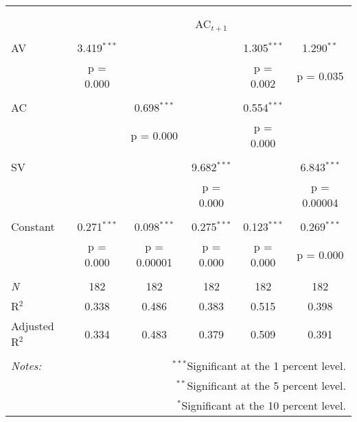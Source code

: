 
\begin{tabular}{@{\extracolsep{5pt}}lccccc} 
\\[-1.8ex]\hline 
\hline \\[-1.8ex] 
\\[-1.8ex] & \multicolumn{5}{c}{AC$_{t+1}$} \\ 
\hline \\[-1.8ex] 
 AV & 3.419$^{***}$ &  &  & 1.305$^{***}$ & 1.290$^{**}$ \\ 
  & p = 0.000 &  &  & p = 0.002 & p = 0.035 \\ 
  & & & & & \\ 
 AC &  & 0.698$^{***}$ &  & 0.554$^{***}$ &  \\ 
  &  & p = 0.000 &  & p = 0.000 &  \\ 
  & & & & & \\ 
 SV &  &  & 9.682$^{***}$ &  & 6.843$^{***}$ \\ 
  &  &  & p = 0.000 &  & p = 0.00004 \\ 
  & & & & & \\ 
 Constant & 0.271$^{***}$ & 0.098$^{***}$ & 0.275$^{***}$ & 0.123$^{***}$ & 0.269$^{***}$ \\ 
  & p = 0.000 & p = 0.00001 & p = 0.000 & p = 0.000 & p = 0.000 \\ 
  & & & & & \\ 
\textit{N} & 182 & 182 & 182 & 182 & 182 \\ 
R$^{2}$ & 0.338 & 0.486 & 0.383 & 0.515 & 0.398 \\ 
Adjusted R$^{2}$ & 0.334 & 0.483 & 0.379 & 0.509 & 0.391 \\ 
\hline 
\hline \\[-1.8ex] 
\textit{Notes:} & \multicolumn{5}{r}{$^{***}$Significant at the 1 percent level.} \\ 
 & \multicolumn{5}{r}{$^{**}$Significant at the 5 percent level.} \\ 
 & \multicolumn{5}{r}{$^{*}$Significant at the 10 percent level.} \\ 
\end{tabular} 

